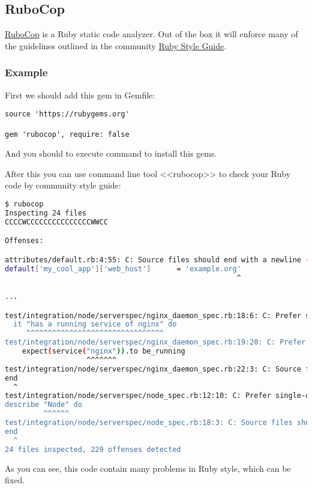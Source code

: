 \subsection{RuboCop}

\href{https://github.com/bbatsov/rubocop}{RuboCop} is a Ruby static code analyzer. Out of the box it will enforce many of the guidelines outlined in the community \href{https://github.com/bbatsov/ruby-style-guide}{Ruby Style Guide}.

\subsubsection{Example}

First we should add this gem in Gemfile:

\begin{lstlisting}[label=lst:testing-test-kitchen1]
source 'https://rubygems.org'

gem 'rubocop', require: false
\end{lstlisting}

And you should to execute  command to install this gems.

After this you can use command line tool <<rubocop>> to check your Ruby code by community style guide:

\begin{lstlisting}[language=Bash,label=lst:testing-robocop1]
$ rubocop
Inspecting 24 files
CCCCWCCCCCCCCCCCCCCCWWCC

Offenses:

attributes/default.rb:4:55: C: Source files should end with a newline (\n).
default['my_cool_app']['web_host']      = 'example.org'
                                                      ^

...

test/integration/node/serverspec/nginx_daemon_spec.rb:18:6: C: Prefer single-quoted strings when you don't need string interpolation or special symbols.
  it "has a running service of nginx" do
     ^^^^^^^^^^^^^^^^^^^^^^^^^^^^^^^^
test/integration/node/serverspec/nginx_daemon_spec.rb:19:20: C: Prefer single-quoted strings when you don't need string interpolation or special symbols.
    expect(service("nginx")).to be_running
                   ^^^^^^^
test/integration/node/serverspec/nginx_daemon_spec.rb:22:3: C: Source files should end with a newline (\n).
end
  ^
test/integration/node/serverspec/node_spec.rb:12:10: C: Prefer single-quoted strings when you don't need string interpolation or special symbols.
describe "Node" do
         ^^^^^^
test/integration/node/serverspec/node_spec.rb:18:3: C: Source files should end with a newline (\n).
end
  ^
24 files inspected, 229 offenses detected
\end{lstlisting}

As you can see, this code contain many problems in Ruby style, which can be fixed.